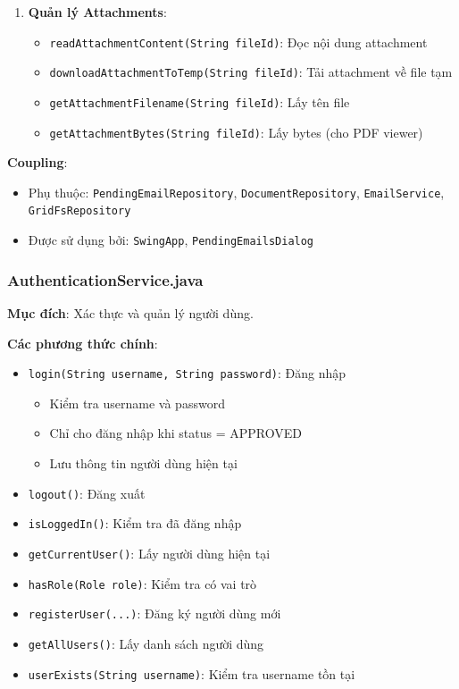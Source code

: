 \documentclass[12pt,a4paper]{article}
\begin{document}
\begin{enumerate}
    \item \textbf{Quản lý Attachments}:
    \begin{itemize}
        \item \texttt{readAttachmentContent(String fileId)}: Đọc nội dung attachment
        \item \texttt{downloadAttachmentToTemp(String fileId)}: Tải attachment về file tạm
        \item \texttt{getAttachmentFilename(String fileId)}: Lấy tên file
        \item \texttt{getAttachmentBytes(String fileId)}: Lấy bytes (cho PDF viewer)
    \end{itemize}
\end{enumerate}

\textbf{Coupling}:
\begin{itemize}
    \item Phụ thuộc: \texttt{PendingEmailRepository}, \texttt{DocumentRepository}, \texttt{EmailService}, \texttt{GridFsRepository}
    \item Được sử dụng bởi: \texttt{SwingApp}, \texttt{PendingEmailsDialog}
\end{itemize}

\subsubsection{AuthenticationService.java}
\textbf{Mục đích}: Xác thực và quản lý người dùng.

\textbf{Các phương thức chính}:
\begin{itemize}
    \item \texttt{login(String username, String password)}: Đăng nhập
    \begin{itemize}
        \item Kiểm tra username và password
        \item Chỉ cho đăng nhập khi status = APPROVED
        \item Lưu thông tin người dùng hiện tại
    \end{itemize}
    \item \texttt{logout()}: Đăng xuất
    \item \texttt{isLoggedIn()}: Kiểm tra đã đăng nhập
    \item \texttt{getCurrentUser()}: Lấy người dùng hiện tại
    \item \texttt{hasRole(Role role)}: Kiểm tra có vai trò
    \item \texttt{registerUser(...)}: Đăng ký người dùng mới
    \item \texttt{getAllUsers()}: Lấy danh sách người dùng
    \item \texttt{userExists(String username)}: Kiểm tra username tồn tại
\end{itemize}
\end{document}
